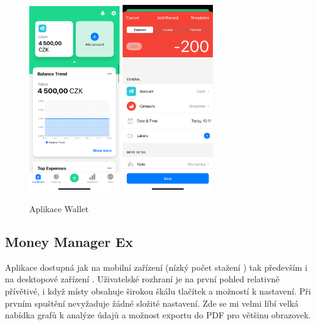 \documentclass[
  biblatex,
  figures=true,
  tables=false,
  glossaries,
  index
]{kidiplom}
\begin{document}
\begin{figure}
  \centering
  \includegraphics[width=0.35\textwidth]{images/wallet1.PNG}
    \hspace{10px}
    \includegraphics[width=0.35\textwidth]{images/wallet2.PNG}
  \caption{Aplikace Wallet}
\end{figure}

\subsection{Money Manager Ex}
Aplikace dostupná jak na mobilní zařízení (nízký počet stažení \cite{money-manager-android}) tak především i na desktopové zařízení \cite{money-manager}. Uživatelské rozhraní je na první pohled relativně přívětivé, i když místy obsahuje širokou škálu tlačítek a možností k nastavení. Při prvním spuštění nevyžaduje žádné složité nastavení. Zde se mi velmi líbí velká nabídka grafů k analýze údajů a možnost exportu do PDF pro většinu obrazovek.
\end{document}
